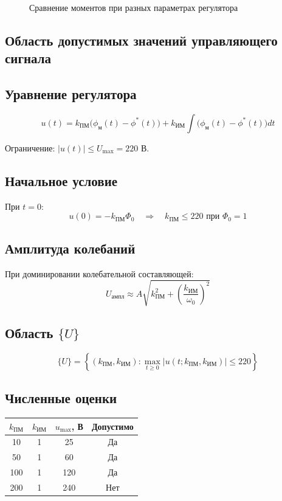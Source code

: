 \documentclass[14pt]{extreport}
\begin{document}
{\begin{figure}[H]
\caption{Сравнение моментов при разных параметрах регулятора}
\end{figure}

        \subsection{Область допустимых значений управляющего сигнала}
        \subsection*{Уравнение регулятора}
\[
u(t) = k_{\text{ПМ}} \bigl( \phi_{\text{м}}(t) - \phi^*(t) \bigr) + k_{\text{ИМ}} \int \bigl( \phi_{\text{м}}(t) - \phi^*(t) \bigr) dt
\]

Ограничение: $|u(t)| \leq U_{\text{max}} = 220$ В.

\subsection*{Начальное условие}
При $t = 0$:
\[
u(0) = -k_{\text{ПМ}} \Phi_0 \quad\Rightarrow\quad k_{\text{ПМ}} \leq 220 \text{ при } \Phi_0 = 1
\]

\subsection*{Амплитуда колебаний}
При доминировании колебательной составляющей:
\[
U_{\text{ампл}} \approx A \sqrt{k_{\text{ПМ}}^2 + \left(\frac{k_{\text{ИМ}}}{\omega_0}\right)^2}
\]

\subsection*{Область $\{U\}$}
\[
\{U\} = \left\{ (k_{\text{ПМ}}, k_{\text{ИМ}}) : \max_{t \geq 0} |u(t; k_{\text{ПМ}}, k_{\text{ИМ}})| \leq 220 \right\}
\]

\subsection*{Численные оценки}
\begin{table}[h]
\centering
\begin{tabular}{|c|c|c|c|}
\hline
$k_{\text{ПМ}}$ & $k_{\text{ИМ}}$ & $u_{\text{max}}$, В & Допустимо \\
\hline
10 & 1 & 25 & Да \\
50 & 1 & 60 & Да \\
100 & 1 & 120 & Да \\
200 & 1 & 240 & Нет \\
\hline
\end{tabular}
\end{table}

}
\end{document}
